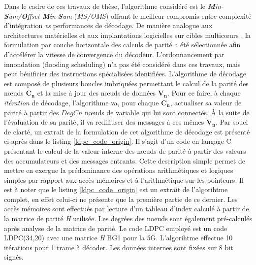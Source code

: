 \documentclass[../main.tex]{subfiles}
\begin{document}
Dans le cadre de ces travaux de thèse, l'algorithme considéré est le \textit{\textbf{M}in-\textbf{S}um/\textbf{O}ffset \textbf{M}in-\textbf{S}um} (\textit{MS/OMS}) offrant le meilleur compromis entre complexité d'intégration \textit{vs} performances de décodage. De manière analogue aux architectures matérielles \cite{LDPC:APPROX:3,LDPC:APPROX:4} et aux implantations logicielles sur cibles multicœurs \cite{LDPC:SOFT4}, la formulation par couche horizontale des calculs de parité a été sélectionnée afin d'accélérer la vitesse de convergence du décodeur. L'ordonnancement par innondation (flooding scheduling) n'a pas été considéré dans ces travaux, mais peut bénificier des instructions spécialisées identifiées. 
L'algorithme de décodage est composé de plusieurs boucles imbriquées permettant le calcul de la parité des nœuds $\bm{C_n}$ et la mise à jour des nœuds de données $\bm{V_n}$. 
Pour ce faire, à chaque \textit{itération} de décodage, l'algorithme va, pour chaque $\bm{C_n}$, actualiser sa valeur de parité à partir des $DegCn$ nœuds de variable qui lui sont connectés. 
À la suite de l'évaluation de sa parité, il va rediffuser des messages à ces mêmes $\bm{V_n}$. Par souci de clarté, un extrait de la formulation de cet algorithme de décodage est présenté ci-après dans le listing \ref{ldpc_code_origin}. Il s'agit d'un code en langage C présentant le calcul de la valeur interne des nœuds de parité à partir des valeurs des accumulateurs et des messages entrants. Cette description simple permet de mettre en exergue la prédominance des opérations arithmétiques et logiques simples par rapport aux accès mémoires et à l'arithmétique sur les pointeurs.
Il est à noter que le listing \ref{ldpc_code_origin} est un extrait de l'algorihtme complet, en effet celui-ci ne présente que la première partie de ce dernier. Les accès mémoires sont effectués par lecture d'un tableau d'index calculé à partir de la matrice de parité \textit{H} utilisée. Les degrées des noeuds sont également pré-calculés après analyse de la matrice de parité. Le code LDPC employé est un code LDPC(34,20) avec une matrice \textit{H} BG1 pour la 5G. L'algorihtme effectue 10 itérations pour 1 trame à décoder. Les données internes sont fixées sur 8 bit signés. 
\end{document}
